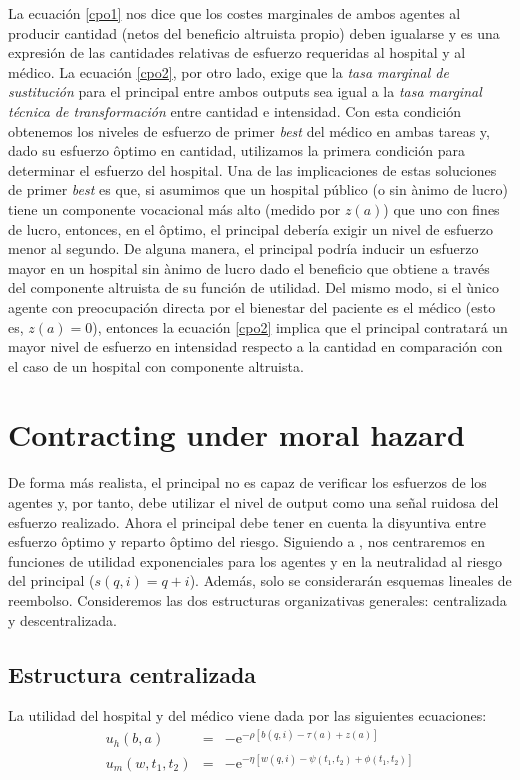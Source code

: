 ﻿\documentclass[12pt,letterpaper]{article}
\newcommand{\e}{\mathrm{e}}
\begin{document}
La ecuaci\'on \ref{cpo1} nos dice que los costes marginales de ambos agentes al producir cantidad (netos del beneficio altruista propio) deben igualarse y es una expresi\'on de las cantidades relativas de esfuerzo requeridas al hospital y al m\'edico. La ecuaci\'on \ref{cpo2}, por otro lado, exige que la \emph{tasa marginal de sustituci\'on} para el principal entre ambos outputs sea igual a la \emph{tasa marginal t\'ecnica de transformaci\'on} entre cantidad e intensidad. Con esta condici\'on obtenemos los niveles de esfuerzo de primer \emph{best} del m\'edico en ambas tareas y, dado su esfuerzo \^optimo en cantidad, utilizamos la primera condici\'on para determinar el esfuerzo del hospital. Una de las implicaciones de estas soluciones de primer \emph{best} es que, si asumimos que un hospital p\'ublico (o sin \`animo de lucro) tiene un componente vocacional m\'as alto (medido por $z(a)$) que uno con fines de lucro, entonces, en el \^optimo, el principal deber\'ia exigir un nivel de esfuerzo menor al segundo. De alguna manera, el principal podr\'ia inducir un esfuerzo mayor en un hospital sin \`animo de lucro dado el beneficio que obtiene a trav\'es del componente altruista de su funci\'on de utilidad. Del mismo modo, si el \`unico agente con preocupaci\'on directa por el bienestar del paciente es el m\'edico (esto es, $z(a)=0$), entonces la ecuaci\'on \ref{cpo2} implica que el principal contratar\'a un mayor nivel de esfuerzo en intensidad respecto a la cantidad en comparaci\'on con el caso de un hospital con componente altruista.

\section{Contracting under moral hazard}

De forma m\'as realista, el principal no es capaz de verificar los esfuerzos de los agentes y, por tanto, debe utilizar el nivel de output como una se\~nal ruidosa del esfuerzo realizado. Ahora el principal debe tener en cuenta la disyuntiva entre esfuerzo \^optimo y reparto \^optimo del riesgo. Siguiendo a \cite{HolmstromMilgrom91}, nos centraremos en funciones de utilidad exponenciales para los agentes y en la neutralidad al riesgo del principal ($s(q,i)=q+i$). Adem\'as, solo se considerar\'an esquemas lineales de reembolso. Consideremos las dos estructuras organizativas generales: centralizada y descentralizada.

\subsection{Estructura centralizada}
La utilidad del hospital y del m\'edico viene dada por las siguientes ecuaciones:
\begin{eqnarray*}
  u_h(b,a) &=& -\e^{-\rho[b(q,i)-\tau(a)+z(a)]} \\
  u_m(w,t_1,t_2) &=& -\e^{-\eta[w(q,i)-\psi(t_1,t_2)+\phi(t_1,t_2)]}
\end{eqnarray*}
\end{document}
